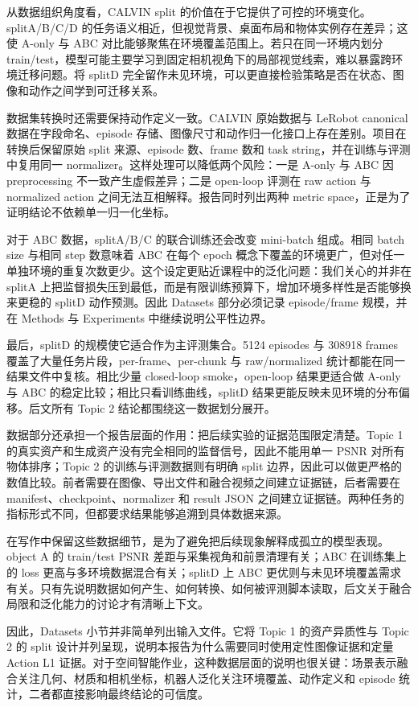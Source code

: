 \documentclass{article}
\begin{document}
	从数据组织角度看，CALVIN split 的价值在于它提供了可控的环境变化。splitA/B/C/D 的任务语义相近，但视觉背景、桌面布局和物体实例存在差异；这使 A-only 与 ABC 对比能够聚焦在环境覆盖范围上。若只在同一环境内划分 train/test，模型可能主要学习到固定相机视角下的局部视觉线索，难以暴露跨环境迁移问题。将 splitD 完全留作未见环境，可以更直接检验策略是否在状态、图像和动作之间学到可迁移关系。

	数据集转换时还需要保持动作定义一致。CALVIN 原始数据与 LeRobot canonical 数据在字段命名、episode 存储、图像尺寸和动作归一化接口上存在差别。项目在转换后保留原始 split 来源、episode 数、frame 数和 task string，并在训练与评测中复用同一 normalizer。这样处理可以降低两个风险：一是 A-only 与 ABC 因 preprocessing 不一致产生虚假差异；二是 open-loop 评测在 raw action 与 normalized action 之间无法互相解释。报告同时列出两种 metric space，正是为了证明结论不依赖单一归一化坐标。

	对于 ABC 数据，splitA/B/C 的联合训练还会改变 mini-batch 组成。相同 batch size 与相同 step 数意味着 ABC 在每个 epoch 概念下覆盖的环境更广，但对任一单独环境的重复次数更少。这个设定更贴近课程中的泛化问题：我们关心的并非在 splitA 上把监督损失压到最低，而是有限训练预算下，增加环境多样性是否能够换来更稳的 splitD 动作预测。因此 Datasets 部分必须记录 episode/frame 规模，并在 Methods 与 Experiments 中继续说明公平性边界。

	最后，splitD 的规模使它适合作为主评测集合。5124 episodes 与 308918 frames 覆盖了大量任务片段，per-frame、per-chunk 与 raw/normalized 统计都能在同一结果文件中复核。相比少量 closed-loop smoke，open-loop 结果更适合做 A-only 与 ABC 的稳定比较；相比只看训练曲线，splitD 结果更能反映未见环境的分布偏移。后文所有 Topic 2 结论都围绕这一数据划分展开。

	数据部分还承担一个报告层面的作用：把后续实验的证据范围限定清楚。Topic 1 的真实资产和生成资产没有完全相同的监督信号，因此不能用单一 PSNR 对所有物体排序；Topic 2 的训练与评测数据则有明确 split 边界，因此可以做更严格的数值比较。前者需要在图像、导出文件和融合视频之间建立证据链，后者需要在 manifest、checkpoint、normalizer 和 result JSON 之间建立证据链。两种任务的指标形式不同，但都要求结果能够追溯到具体数据来源。

	在写作中保留这些数据细节，是为了避免把后续现象解释成孤立的模型表现。object A 的 train/test PSNR 差距与采集视角和前景清理有关；ABC 在训练集上的 loss 更高与多环境数据混合有关；splitD 上 ABC 更优则与未见环境覆盖需求有关。只有先说明数据如何产生、如何转换、如何被评测脚本读取，后文关于融合局限和泛化能力的讨论才有清晰上下文。

	因此，Datasets 小节并非简单列出输入文件。它将 Topic 1 的资产异质性与 Topic 2 的 split 设计并列呈现，说明本报告为什么需要同时使用定性图像证据和定量 Action L1 证据。对于空间智能作业，这种数据层面的说明也很关键：场景表示融合关注几何、材质和相机坐标，机器人泛化关注环境覆盖、动作定义和 episode 统计，二者都直接影响最终结论的可信度。
\end{document}
